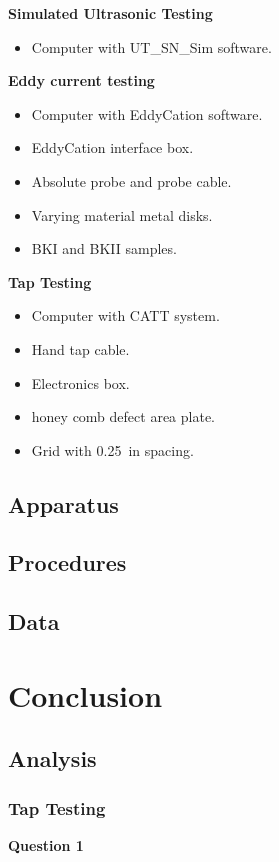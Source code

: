 \documentclass[12 pt]{report}
\begin{document}
\textbf{Simulated Ultrasonic Testing}
\begin{itemize}
	\item Computer with UT\_SN\_Sim software.
\end{itemize}

\textbf{Eddy current testing}
\begin{itemize}
	\item Computer with EddyCation software.
	\item EddyCation interface box.
	\item Absolute probe and probe cable.
	\item Varying material metal disks.
	\item BKI and BKII samples.
\end{itemize}

\textbf{Tap Testing}
\begin{itemize}
	\item Computer with CATT system.
	\item Hand tap cable.
	\item Electronics box.
	\item {} honey comb defect area plate.
	\item Grid with \qty{0.25}{in} spacing.
\end{itemize}

\section{Apparatus} \label{apparatus}

\section{Procedures} \label{procedures}

\section{Data} \label{data}

\chapter{Conclusion} \label{conclusion-chapter}
\section{Analysis} \label{analysis}
\subsection{Tap Testing} \label{tap_testing}
\textbf{Question 1}
\end{document}
